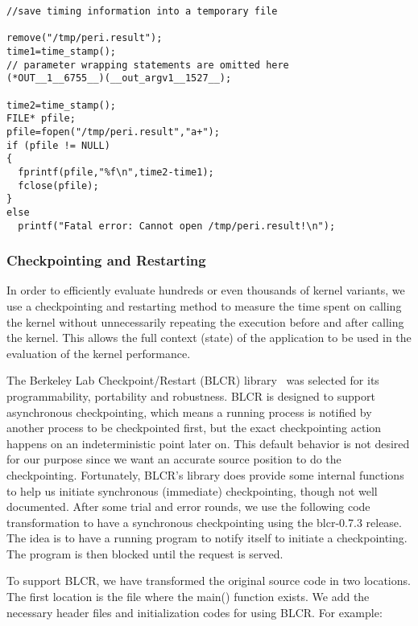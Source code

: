 {\mySmallFontSize
\begin{verbatim}
//save timing information into a temporary file

remove("/tmp/peri.result");
time1=time_stamp();
// parameter wrapping statements are omitted here
(*OUT__1__6755__)(__out_argv1__1527__);

time2=time_stamp();
FILE* pfile;
pfile=fopen("/tmp/peri.result","a+");
if (pfile != NULL)
{
  fprintf(pfile,"%f\n",time2-time1);
  fclose(pfile);
}
else
  printf("Fatal error: Cannot open /tmp/peri.result!\n");

\end{verbatim}
}

\subsubsection{Checkpointing and Restarting}
In order to efficiently evaluate hundreds or even thousands of kernel
variants, we use a checkpointing and restarting method to measure the time
spent on calling the kernel without unnecessarily repeating the execution
before and after calling the kernel.  This allows the full context (state) 
of the application to be used in the evaluation of the kernel performance.

The Berkeley Lab Checkpoint/Restart (BLCR) library~\cite{blcrWeb} was selected for its
programmability, portability and robustness. 
BLCR is designed to support asynchronous checkpointing, which means a running process
is notified by another process to be checkpointed first, but the exact checkpointing
action happens on an indeterministic point later on. 
This default behavior is not desired for our purpose since we want an
accurate source position to do the checkpointing. 
Fortunately, BLCR's library does provide some internal functions to help
us initiate synchronous (immediate) checkpointing, though not well documented. 
After some trial and error rounds, we use the following code transformation
to have a synchronous checkpointing using the blcr-0.7.3 release.
The idea is to have a running program to notify itself to initiate a checkpointing. 
The program is then blocked until the request is served. 

To support BLCR, we have transformed the original source code in two locations.
The first location is the file where the main() function exists. We add the necessary
header files and initialization codes for using BLCR.  For example:


